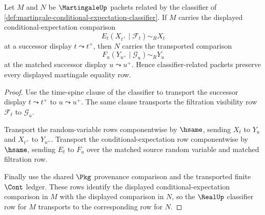 \begin{theorem}
\label{thm:martingale-conditional-expectation-stability}
Let $M$ and $N$ be $\MartingaleUp$ packets related by the classifier of \autoref{def:martingale-conditional-expectation-classifier}. If $M$ carries the displayed conditional-expectation comparison
$$
E_t(X_{t^+}\mid\mathcal{F}_t)\sim_R X_t
$$
at a successor display $t\leadsto t^+$, then $N$ carries the transported comparison
$$
F_u(Y_{u^+}\mid\mathcal{G}_u)\sim_R Y_u
$$
at the matched successor display $u\leadsto u^+$. Hence classifier-related packets preserve every displayed martingale equality row.
\end{theorem}
\begin{proof}
Use the time-spine clause of the classifier to transport the successor display $t\leadsto t^+$ to $u\leadsto u^+$. The same clause transports the filtration visibility row $\mathcal{F}_t$ to $\mathcal{G}_u$.

Transport the random-variable rows componentwise by $\hsame$, sending $X_t$ to $Y_u$ and $X_{t^+}$ to $Y_{u^+}$. Transport the conditional-expectation row componentwise by $\hsame$, sending $E_t$ to $F_u$ over the matched source random variable and matched filtration row.

Finally use the shared $\Pkg$ provenance comparison and the transported finite $\Cont$ ledger. These rows identify the displayed conditional-expectation comparison in $M$ with the displayed comparison in $N$, so the $\RealUp$ classifier row for $M$ transports to the corresponding row for $N$.
\end{proof}

